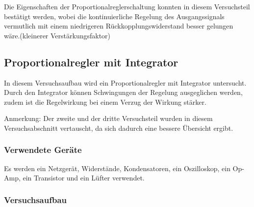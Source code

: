 \documentclass[12pt,a4paper]{article}
\begin{document}
Die Eigenschaften der Proportionalreglerschaltung konnten in diesem Versuchsteil bestätigt werden, wobei die kontinuierliche Regelung des Ausgangssignals vermutlich mit einem niedrigeren Rückkopplungswiderstand besser gelungen wäre.(kleinerer Verstärkungsfaktor)


\subsection{Proportionalregler mit Integrator}

In diesem Versuchsaufbau wird ein Proportionalregler mit Integrator untersucht. Durch den Integrator können Schwingungen der Regelung ausgeglichen werden, zudem ist die Regelwirkung bei einem Verzug der Wirkung stärker.


\begin{framed}
\noindent
Anmerkung: \newline
Der zweite und der dritte Versuchsteil wurden in diesem Versuchsabschnitt vertauscht, da sich dadurch eine bessere Übersicht ergibt.
\end{framed}


\subsubsection*{Verwendete Geräte}

Es werden ein Netzgerät, Widerstände, Kondensatoren, ein Oszilloskop, ein Op-Amp, ein Transistor und ein Lüfter verwendet.


\subsubsection*{Versuchsaufbau}
\end{document}
